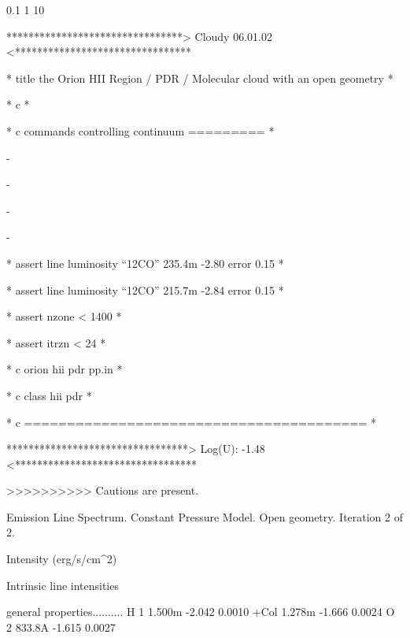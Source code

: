 {      0.1                                     1                        
10                                     

 
                       ********************************> Cloudy 06.01.02
<********************************

                       * title the Orion HII Region / PDR / Molecular cloud
with an open geometry        *

                       * c                                             
*

                       * c commands controlling continuum =========    
*

               -

               -

               -

               -

                       * assert line luminosity ``12CO'' 235.4m  -2.80 error
0.15                          *

                       * assert line luminosity ``12CO'' 215.7m  -2.84 error
0.15                          *

                       * assert nzone < 1400                           
*

                       * assert itrzn < 24                             
*

                       * c orion hii pdr pp.in                         
*

                       * c class hii pdr                               
*

                       * c ========================================    
*

                       *********************************> Log(U): -1.48
<*********************************

                       >>>>>>>>>> Cautions are present.



 
                     Emission Line Spectrum.  Constant  Pressure Model.
Open geometry.  Iteration 2 of 2.

                                                    Intensity (erg/s/cm^2)

 
                                                   Intrinsic line intensities

 general properties..........      H  1 1.500m  -2.042   0.0010      +Col
1.278m  -1.666   0.0024      O  2 833.8A  -1.615   0.0027            

}

